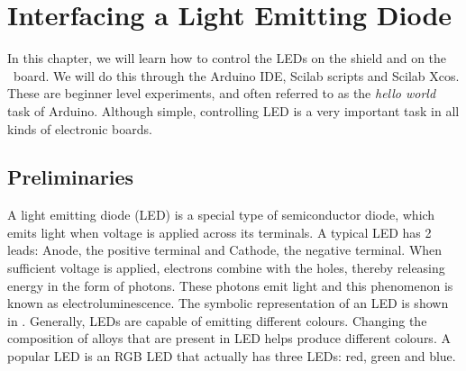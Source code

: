 \chapter {Interfacing a Light Emitting Diode}
\thispagestyle{empty}
\label{led}
\newcommand{\LocLEDfig}{\Origin/user-code/led/figures}
\newcommand{\LocLEDscicode}{\Origin/user-code/led/scilab}
\newcommand{\LocLEDscibrief}[1]{{\tt \seqsplit{%
    Origin/user-code/led/scilab/#1}}, see \fnrefp{fn:file-loc}} 
\newcommand{\LocLEDardcode}{\Origin/user-code/led/arduino}
\newcommand{\LocLEDardbrief}[1]{{\tt \seqsplit{%
    Origin/user-code/led/arduino/#1}}, see \fnrefp{fn:file-loc}}

\newcommand{\LocLEDpycode}{\Origin/user-code/led/python}  %
\newcommand{\LocLEDpybrief}[1]{{\tt \seqsplit{%
    Origin/user-code/led/python/#1}}, see \fnrefp{fn:file-loc}} %


\newcommand{\LocLEDjuliacode}{\Origin/user-code/led/julia}  %
\newcommand{\LocLEDjuliabrief}[1]{{\tt \seqsplit{%
    Origin/user-code/led/julia/#1}}, see \fnrefp{fn:file-loc}} %

\newcommand{\LocLEDOpenModelicacode}{\Origin/user-code/led/OpenModelica}  %
\newcommand{\LocLEDOpenModelicabrief}[1]{{\tt \seqsplit{%
    Origin/user-code/led/OpenModelica/#1}}, see \fnrefp{fn:file-loc}} %


In this chapter, we will learn how to control the LEDs on the shield
and on the \arduino\ board.  We will do this through the Arduino IDE,
Scilab scripts and Scilab Xcos.  These are beginner level experiments,
and often referred to as the \emph{hello world} task of Arduino.
Although simple, controlling LED is a very important task in all
kinds of electronic boards.

\section{Preliminaries}
\label{sec:led-pril}
A light emitting diode (LED) is a special type of semiconductor diode,
which emits light when voltage is applied across its terminals. A
typical LED has 2 leads: Anode, the positive terminal and Cathode, the
negative terminal.  When sufficient voltage is applied, electrons
combine with the holes, thereby releasing energy in the form of
photons.  These photons emit light and this phenomenon is known as
electroluminescence.  The symbolic representation of an LED is shown
in .  Generally, LEDs are capable of emitting
different colours.  Changing the composition of alloys that are
present in LED helps produce different colours.  A popular LED is an
RGB LED that actually has three LEDs: red, green and blue.

